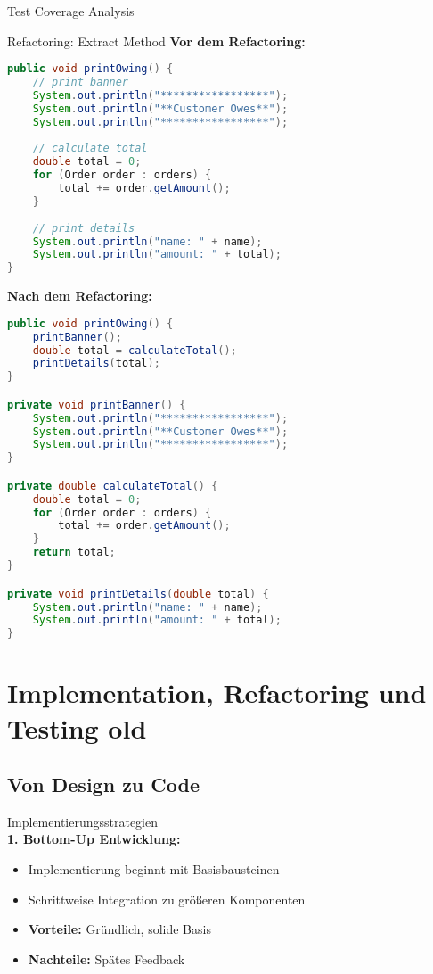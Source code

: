 \begin{example2}{Test Coverage Analysis}
\begin{example2}{Refactoring: Extract Method}
\textbf{Vor dem Refactoring:}
\begin{lstlisting}[language=Java, style=basesmol]
public void printOwing() {
    // print banner
    System.out.println("*****************");
    System.out.println("**Customer Owes**");
    System.out.println("*****************");
    
    // calculate total
    double total = 0;
    for (Order order : orders) {
        total += order.getAmount();
    }
    
    // print details
    System.out.println("name: " + name);
    System.out.println("amount: " + total);
}
\end{lstlisting}

\textbf{Nach dem Refactoring:}
\begin{lstlisting}[language=Java, style=basesmol]
public void printOwing() {
    printBanner();
    double total = calculateTotal();
    printDetails(total);
}

private void printBanner() {
    System.out.println("*****************");
    System.out.println("**Customer Owes**");
    System.out.println("*****************");
}

private double calculateTotal() {
    double total = 0;
    for (Order order : orders) {
        total += order.getAmount();
    }
    return total;
}

private void printDetails(double total) {
    System.out.println("name: " + name);
    System.out.println("amount: " + total);
}
\end{lstlisting}
\end{example2}




\pagebreak
\section{Implementation, Refactoring und Testing old}

\subsection{Von Design zu Code}

\begin{concept}{Implementierungsstrategien}\\
\textbf{1. Bottom-Up Entwicklung:}
\begin{itemize}
    \item Implementierung beginnt mit Basisbausteinen
    \item Schrittweise Integration zu größeren Komponenten
    \item \textbf{Vorteile:} Gründlich, solide Basis
    \item \textbf{Nachteile:} Spätes Feedback
\end{itemize}


\end{concept}
\end{example2}
